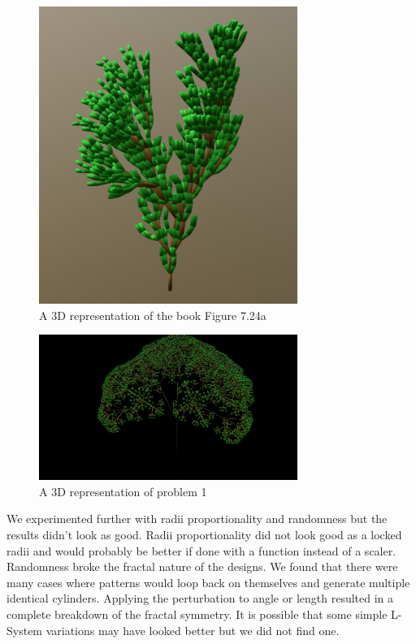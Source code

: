\begin{figure}[H]
    \centering
    \noindent\includegraphics[width=0.75\textwidth]{figures/L-systems/a3d}
    \caption[3D L-system Example]{A 3D representation of the book Figure 7.24a}
    \label{fig:a_3d}
\end{figure}

\begin{figure}[H]
    \centering
    \noindent\includegraphics[width=0.75\textwidth]{figures/L-systems/prob13d}
    \caption[3D Representation of Problem 1]{A 3D representation of problem 1}
    \label{fig:prob1_3d}
\end{figure}

We experimented further with radii proportionality and randomness but the
results didn't look as good. Radii proportionality did not look good as a
locked radii and would probably be better if done with a function instead of a
scaler. Randomness broke the fractal nature of the designs. We found that there
were many cases where patterns would loop back on themselves and generate
multiple identical cylinders. Applying the perturbation to angle or length
resulted in a complete breakdown of the fractal symmetry. It is possible that
some simple L-System variations may have looked better but we did not find one.

